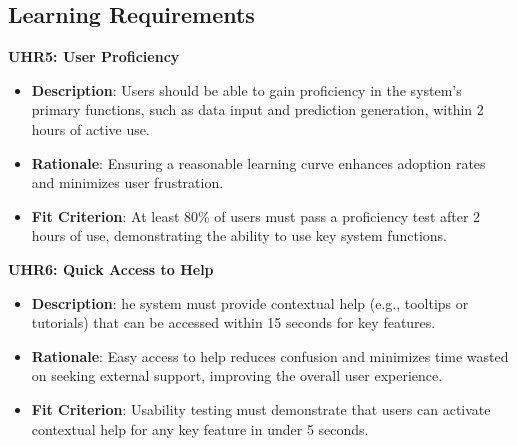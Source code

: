 \documentclass[12pt]{article}
\begin{document}
\subsection{Learning Requirements}
\textbf{UHR5: User Proficiency}
\begin{itemize}
    \item \textbf{Description}: Users should be able to gain proficiency in the
    system's primary functions, such as data input and prediction generation,
    within 2 hours of active use.
    \item \textbf{Rationale}: Ensuring a reasonable learning curve enhances
    adoption rates and minimizes user frustration.
    \item \textbf{Fit Criterion}: At least 80\% of users must pass a proficiency
    test after 2 hours of use, demonstrating the ability to use key system
    functions.
\end{itemize}
\textbf{UHR6: Quick Access to Help}
\begin{itemize}
    \item \textbf{Description}: he system must provide contextual help (e.g.,
    tooltips or tutorials) that can be accessed within 15 seconds for key
    features.
    \item \textbf{Rationale}: Easy access to help reduces confusion and
    minimizes time wasted on seeking external support, improving the overall
    user experience.
    \item \textbf{Fit Criterion}: Usability testing must demonstrate that users
    can activate contextual help for any key feature in under 5 seconds.
\end{itemize}
\end{document}

